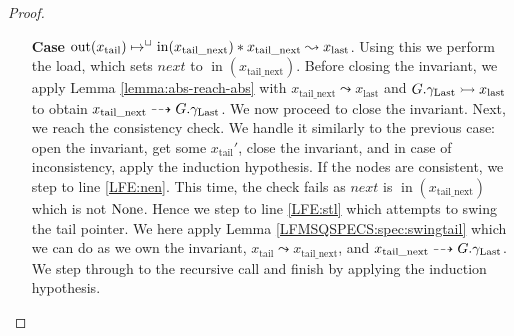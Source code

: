\documentclass[a4paper, 10pt]{report}
\theoremstyle{definition}
\newcommand{\nIn}[1]{\operatorname{in}(#1)}
\newcommand{\nOut}[1]{\operatorname{out}(#1)}
\newcommand{\node}{x}
\newcommand{\nodeN}[1]{\node_{\mathrm{#1}}}
\newcommand{\nodetail}{\nodeN{tail}}
\newcommand{\nodelast}{\nodeN{last}}
\newcommand{\nodetailnext}{\nodeN{tail\_next}}
\newcommand{\Qg}{G}
\newcommand{\glast}{\gname_{\mathrm{Last}}}
\newcommand{\reach}[2]{#1 \leadsto #2}
\newcommand{\ar}[2]{#1 \dashrightarrow #2}
\newcommand{\ap}[2]{#1 \rightarrowtail #2}
\begin{document}
\begin{proof}
\begin{itemize}
    \item[\textbf{Case}]
    $\nOut{\nodetail} \mapsto^{\persistently} \nIn{\nodetailnext} \star{} \reach{\nodetailnext}{\nodelast}$. Using this we perform the load, which sets $next$ to $\nIn{\nodetailnext}$. Before closing the invariant, we apply Lemma \ref{lemma:abs-reach-abs} with $\reach{\nodetailnext}{\nodelast}$ and $\ap{\Qg.\glast}{\nodelast}$ to obtain $\ar{\nodetailnext}{\Qg.\glast}$. We now proceed to close the invariant. Next, we reach the consistency check. We handle it similarly to the previous case: open the invariant, get some $\nodetail'$, close the invariant, and in case of inconsistency, apply the induction hypothesis. If the nodes are consistent, we step to line \ref{LFE:nen}. This time, the check fails as $next$ is $\nIn{\nodetailnext}$ which is not $\operatorname{None}$. Hence we step to line \ref{LFE:stl} which attempts to swing the tail pointer. We here apply Lemma \ref{LFMSQSPECS:spec:swingtail} which we can do as we own the invariant, $\reach{\nodetail}{\nodetailnext}$, and $\ar{\nodetailnext}{\Qg.\glast}$. We step through to the recursive call and finish by applying the induction hypothesis.
  \end{itemize}
\end{proof}
\end{document}
